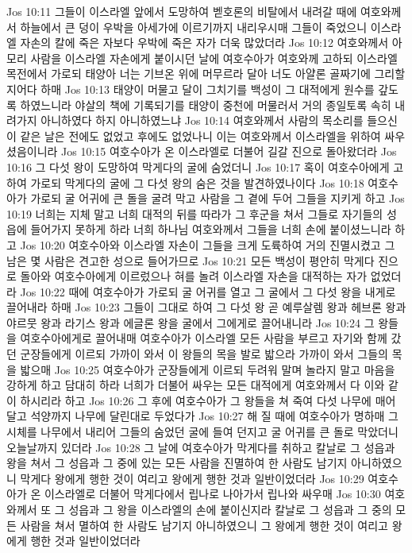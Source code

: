 Jos 10:11  그들이 이스라엘 앞에서 도망하여 벧호론의 비탈에서 내려갈 때에 여호와께서 하늘에서 큰 덩이 우박을 아세가에 이르기까지 내리우시매 그들이 죽었으니 이스라엘 자손의 칼에 죽은 자보다 우박에 죽은 자가 더욱 많았더라
Jos 10:12  여호와께서 아모리 사람을 이스라엘 자손에게 붙이시던 날에 여호수아가 여호와께 고하되 이스라엘 목전에서 가로되 태양아 너는 기브온 위에 머무르라 달아 너도 아얄론 골짜기에 그리할지어다 하매
Jos 10:13  태양이 머물고 달이 그치기를 백성이 그 대적에게 원수를 갚도록 하였느니라 야살의 책에 기록되기를 태양이 중천에 머물러서 거의 종일토록 속히 내려가지 아니하였다 하지 아니하였느냐
Jos 10:14  여호와께서 사람의 목소리를 들으신 이 같은 날은 전에도 없었고 후에도 없었나니 이는 여호와께서 이스라엘을 위하여 싸우셨음이니라
Jos 10:15  여호수아가 온 이스라엘로 더불어 길갈 진으로 돌아왔더라
Jos 10:16  그 다섯 왕이 도망하여 막게다의 굴에 숨었더니
Jos 10:17  혹이 여호수아에게 고하여 가로되 막게다의 굴에 그 다섯 왕의 숨은 것을 발견하였나이다
Jos 10:18  여호수아가 가로되 굴 어귀에 큰 돌을 굴려 막고 사람을 그 곁에 두어 그들을 지키게 하고
Jos 10:19  너희는 지체 말고 너희 대적의 뒤를 따라가 그 후군을 쳐서 그들로 자기들의 성읍에 들어가지 못하게 하라 너희 하나님 여호와께서 그들을 너희 손에 붙이셨느니라 하고
Jos 10:20  여호수아와 이스라엘 자손이 그들을 크게 도륙하여 거의 진멸시켰고 그 남은 몇 사람은 견고한 성으로 들어가므로
Jos 10:21  모든 백성이 평안히 막게다 진으로 돌아와 여호수아에게 이르렀으나 혀를 놀려 이스라엘 자손을 대적하는 자가 없었더라
Jos 10:22  때에 여호수아가 가로되 굴 어귀를 열고 그 굴에서 그 다섯 왕을 내게로 끌어내라 하매
Jos 10:23  그들이 그대로 하여 그 다섯 왕 곧 예루살렘 왕과 헤브론 왕과 야르뭇 왕과 라기스 왕과 에글론 왕을 굴에서 그에게로 끌어내니라
Jos 10:24  그 왕들을 여호수아에게로 끌어내매 여호수아가 이스라엘 모든 사람을 부르고 자기와 함께 갔던 군장들에게 이르되 가까이 와서 이 왕들의 목을 발로 밟으라 가까이 와서 그들의 목을 밟으매
Jos 10:25  여호수아가 군장들에게 이르되 두려워 말며 놀라지 말고 마음을 강하게 하고 담대히 하라 너희가 더불어 싸우는 모든 대적에게 여호와께서 다 이와 같이 하시리라 하고
Jos 10:26  그 후에 여호수아가 그 왕들을 쳐 죽여 다섯 나무에 매어 달고 석양까지 나무에 달린대로 두었다가
Jos 10:27  해 질 때에 여호수아가 명하매 그 시체를 나무에서 내리어 그들의 숨었던 굴에 들여 던지고 굴 어귀를 큰 돌로 막았더니 오늘날까지 있더라
Jos 10:28  그 날에 여호수아가 막게다를 취하고 칼날로 그 성읍과 왕을 쳐서 그 성읍과 그 중에 있는 모든 사람을 진멸하여 한 사람도 남기지 아니하였으니 막게다 왕에게 행한 것이 여리고 왕에게 행한 것과 일반이었더라
Jos 10:29  여호수아가 온 이스라엘로 더불어 막게다에서 립나로 나아가서 립나와 싸우매
Jos 10:30  여호와께서 또 그 성읍과 그 왕을 이스라엘의 손에 붙이신지라 칼날로 그 성읍과 그 중의 모든 사람을 쳐서 멸하여 한 사람도 남기지 아니하였으니 그 왕에게 행한 것이 여리고 왕에게 행한 것과 일반이었더라

